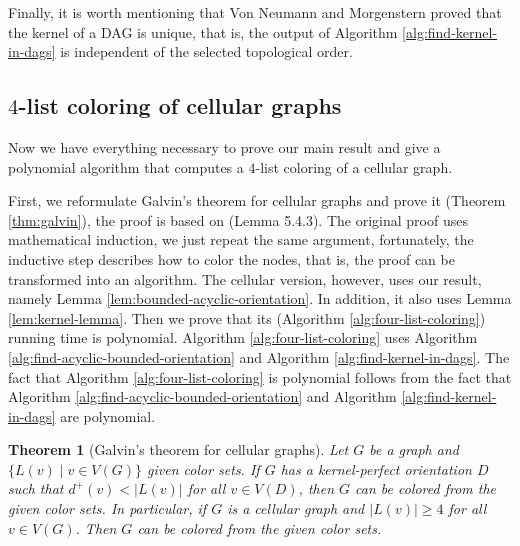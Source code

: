\documentclass[a4paper, 12pt]{article}
\newtheorem{theo}[lem]{Theorem}
\begin{document}
Finally, it is worth mentioning that Von Neumann and Morgenstern \cite{neumann} proved that the kernel of a DAG is unique, that is, the output of Algorithm \ref{alg:find-kernel-in-dags} is independent of the selected topological order.
\subsection{$4$-list coloring of cellular graphs}\label{sec:4-list-coloring}
Now we have everything necessary to prove our main result and give a polynomial algorithm that computes a $4$-list coloring of a cellular graph. 

First, we reformulate Galvin's theorem for cellular graphs and prove it (Theorem \ref{thm:galvin}), the proof is based on \cite{citeulike:395714} (Lemma 5.4.3). The original proof uses mathematical induction, we just repeat the same argument, fortunately, the inductive step describes how to color the nodes, that is, the proof can be transformed into an algorithm. The cellular version, however, uses our result, namely Lemma \ref{lem:bounded-acyclic-orientation}. In addition, it also uses Lemma \ref{lem:kernel-lemma}. Then we prove that its (Algorithm \ref{alg:four-list-coloring}) running time is polynomial. Algorithm \ref{alg:four-list-coloring} uses Algorithm \ref{alg:find-acyclic-bounded-orientation} and Algorithm \ref{alg:find-kernel-in-dags}. The fact that Algorithm \ref{alg:four-list-coloring} is polynomial follows from the fact that Algorithm \ref{alg:find-acyclic-bounded-orientation} and Algorithm \ref{alg:find-kernel-in-dags} are polynomial.
\begin{theo}[Galvin's theorem for cellular graphs] Let $G$ be a graph and $\lbrace L(v) \mid v \in V(G) \rbrace$ given color sets. If $G$ has a kernel-perfect orientation $D$ such that $d^+(v) < |L(v)|$ for all $v \in V(D)$, then $G$ can be colored from the given color sets.
In particular, if $G$ is a cellular graph and $|L(v)| \geqslant 4$ for all $v \in V(G)$. Then $G$ can be colored from the given color sets.
\end{theo}
\end{document}
